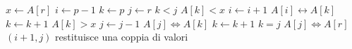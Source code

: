 \begin{codebox}
\li $x \gets A[r]$
\li $i \gets p-1$
\li $k \gets p$
\li $j \gets r$
\li \While $k < j$
\li     \Do
            \If $A[k] < x$
\li             \Then
                    $i \gets  i + 1$
\li                 $A[i] \leftrightarrow A[k]$
\li                 $k \gets k + 1$
\li             \Else \If $A[k] > x$
\li                 $j \gets j - 1$
\li                 $A[j] \Leftrightarrow A[k]$
\li             \Else
\li                 $k \gets k + 1$
                \End
        \End
\zi \Comment $k = j$
\li $A[j] \Leftrightarrow A[r]$
\li \Return $(i+1,j)$ \Comment restituisce una coppia di valori
\end{codebox}